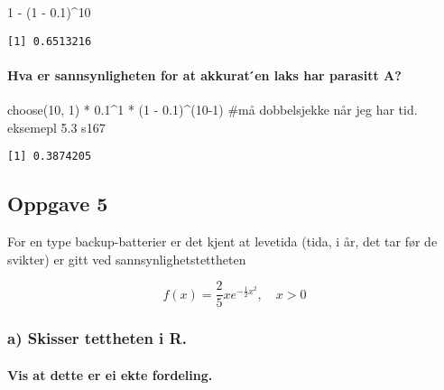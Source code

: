 \documentclass[
  12pt,
  a4paper,
  DIV=11,
  numbers=noendperiod]{scrartcl}
\let\oldparagraph\paragraph
\renewcommand{\paragraph}[1]{\oldparagraph{#1}\mbox{}}
\newenvironment{Shaded}{\begin{snugshade}}{\end{snugshade}}
\newcommand{\CommentTok}[1]{\textcolor[rgb]{0.37,0.37,0.37}{#1}}
\newcommand{\DecValTok}[1]{\textcolor[rgb]{0.68,0.00,0.00}{#1}}
\newcommand{\FloatTok}[1]{\textcolor[rgb]{0.68,0.00,0.00}{#1}}
\newcommand{\FunctionTok}[1]{\textcolor[rgb]{0.28,0.35,0.67}{#1}}
\newcommand{\NormalTok}[1]{\textcolor[rgb]{0.00,0.23,0.31}{#1}}
\newcommand{\SpecialCharTok}[1]{\textcolor[rgb]{0.37,0.37,0.37}{#1}}
\begin{document}
\begin{Shaded}
\begin{Highlighting}[]
\DecValTok{1} \SpecialCharTok{{-}}\NormalTok{ (}\DecValTok{1} \SpecialCharTok{{-}} \FloatTok{0.1}\NormalTok{)}\SpecialCharTok{\^{}}\DecValTok{10}
\end{Highlighting}
\end{Shaded}

\begin{verbatim}
[1] 0.6513216
\end{verbatim}

\paragraph{Hva er sannsynligheten for at akkurat ́en laks har parasitt
A?}\label{hva-er-sannsynligheten-for-at-akkurat-en-laks-har-parasitt-a}

\begin{Shaded}
\begin{Highlighting}[]
\FunctionTok{choose}\NormalTok{(}\DecValTok{10}\NormalTok{, }\DecValTok{1}\NormalTok{) }\SpecialCharTok{*} \FloatTok{0.1}\SpecialCharTok{\^{}}\DecValTok{1} \SpecialCharTok{*}\NormalTok{ (}\DecValTok{1} \SpecialCharTok{{-}} \FloatTok{0.1}\NormalTok{)}\SpecialCharTok{\^{}}\NormalTok{(}\DecValTok{10{-}1}\NormalTok{) }\CommentTok{\#må dobbelsjekke når jeg har tid. eksemepl 5.3 s167}
\end{Highlighting}
\end{Shaded}

\begin{verbatim}
[1] 0.3874205
\end{verbatim}

\subsection{Oppgave 5}\label{oppgave-5}

For en type backup-batterier er det kjent at levetida (tida, i år, det
tar før de svikter) er gitt ved sannsynlighetstettheten

\[
f(x) = \frac{2}{5} x e^{-\frac{1}{2}x^2}, \quad x > 0
\]

\subsubsection{a) Skisser tettheten i
R.}\label{a-skisser-tettheten-i-r.}

\paragraph{Vis at dette er ei ekte
fordeling.}\label{vis-at-dette-er-ei-ekte-fordeling.}
\end{document}
